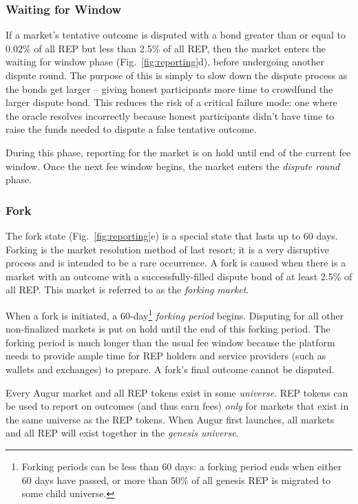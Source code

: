 \documentclass[floatfix,reprint,nofootinbib,amsmath,amssymb,epsfig,pre,floats,letterpaper,groupedaffiliation]{revtex4-1}
\theoremstyle{definition}
\theoremstyle{definition}
\begin{document}
\subsubsection{Waiting for Window}

If a market's tentative outcome is disputed with a bond greater than or equal to 0.02\% of all REP but less than 2.5\% of all REP, then the market enters the waiting for window phase (Fig.~\ref{fig:reporting}d), before undergoing another dispute round. The purpose of this is simply to slow down the dispute process as the bonds get larger -- giving honest participants more time to crowdfund the larger dispute bond. This reduces the risk of a critical failure mode: one where the oracle resolves incorrectly because honest participants didn't have time to raise the funds needed to dispute a false tentative outcome.

During this phase, reporting for the market is on hold until end of the current fee window.  Once the next fee window begins, the market enters the \textit{dispute round} phase.

\subsubsection{Fork}\label{section:fork}

The fork state (Fig.~\ref{fig:reporting}e) is a special state that lasts up to 60 days.  Forking is the market resolution method of last resort; it is a very disruptive process and is intended to be a rare occurrence.  A fork is caused when there is a market with an outcome with a successfully-filled dispute bond of at least 2.5\% of all REP.  This market is referred to as the \textit{forking market}.

When a fork is initiated, a 60-day\footnote{Forking periods can be less than 60 days: a forking period ends when either 60 days have passed, or more than 50\% of all genesis REP is migrated to some child universe.} \textit{forking period} begins.  Disputing for all other non-finalized markets is put on hold until the end of this forking period.  The forking period is much longer than the usual fee window because the platform needs to provide ample time for REP holders and service providers (such as wallets and exchanges) to prepare.  A fork's final outcome cannot be disputed.

Every Augur market and all REP tokens exist in some \textit{universe}.  REP tokens can be used to report on outcomes (and thus earn fees) \textit{only} for markets that exist in the same universe as the REP tokens.  When Augur first launches, all markets and all REP will exist together in the \textit{genesis universe}.
\end{document}
